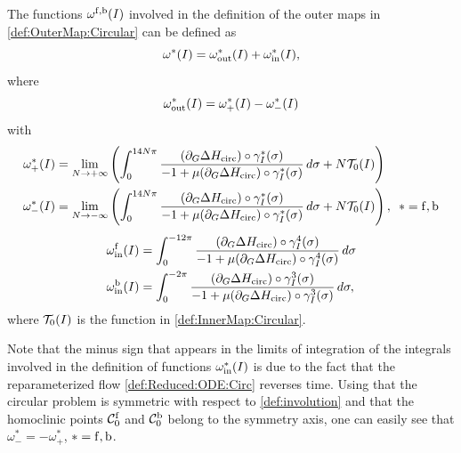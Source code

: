 \begin{lemma}\label{lem:Omega0}
  The functions $\omega^{\mathrm{f},\mathrm{b}}(I)$ involved in the definition of the outer
  maps in \eqref{def:OuterMap:Circular} can be defined as
  \[
  \omega^\ast(I)= \omega^\ast_{\mathrm{out}}(I)+\omega_{\mathrm{in}}^\ast (I),
  \]
where
\begin{equation}\label{def:Omega0:OuterPart}
 \omega^\ast_{\mathrm{out}}(I)=\omega_+^\ast(I)-\omega^\ast_-(I)
\end{equation}
  with
  \begin{equation}\label{def:Omega0PlusMinus}
 \begin{split}
 \omega_+^\ast(I)&=\lim_{N\rightarrow+\infty}\left(\int_0^{ 14N\pi
      }\frac{(\partial_G\Delta
        H_{\mathrm{circ}}) \circ \gamma_I^\ast(\sigma)}{-1+\mu(\partial_G\Delta
        H_{\mathrm{circ}}) \circ \gamma_I^\ast(\sigma)} \, d\sigma+N\mathcal{T}_0(I)\right)\\
\omega^\ast_-(I)&=\lim_{N\rightarrow-\infty}\left(\int_0^{ 14N\pi
      }\frac{(\partial_G\Delta
        H_{\mathrm{circ}}) \circ \gamma_I^\ast(\sigma)}{-1+\mu(\partial_G\Delta
        H_{\mathrm{circ}}) \circ \gamma_I^\ast(\sigma)} \, d\sigma+N\mathcal{T}_0(I)\right),\,\,\,\ast=\mathrm{f},\mathrm{b}
\end{split}
\end{equation}
\begin{equation}\label{def:Omega0:InnerPart}
\begin{split}
 \omega_{\mathrm{in}}^{\mathrm{f}}(I)&=\int_0^{ -12\pi
      }\frac{(\partial_G\Delta
        H_{\mathrm{circ}}) \circ \gamma_I^4(\sigma)}{-1+\mu(\partial_G\Delta
        H_{\mathrm{circ}}) \circ \gamma_I^4(\sigma)} \, d\sigma\\
\omega_{\mathrm{in}}^{\mathrm{b}}(I)&=\int_0^{ -2\pi
      }\frac{(\partial_G\Delta
        H_{\mathrm{circ}}) \circ \gamma_I^3(\sigma)}{-1+\mu(\partial_G\Delta
        H_{\mathrm{circ}}) \circ \gamma_I^3(\sigma)} \, d\sigma,
\end{split}
\end{equation}
where  $\mathcal{T}_0(I)$ is the function in \eqref{def:InnerMap:Circular}.
\end{lemma}

Note that the minus sign that appears in the limits of integration of the
integrals involved in the definition of functions $\omega_{\mathrm{in}}^\ast(I)$ is
due to the fact that the reparameterized flow \eqref{def:Reduced:ODE:Circ}
reverses time. Using that the circular problem is symmetric with respect
to \eqref{def:involution} and that the homoclinic points $\mathcal{C}_0^{\mathrm{f}}$
and $\mathcal{C}_0^{\mathrm{b}}$ belong to the symmetry axis, one can easily see that
$\omega^\ast_-=-\omega^\ast_+$, $\ast=\mathrm{f},\mathrm{b}$.

